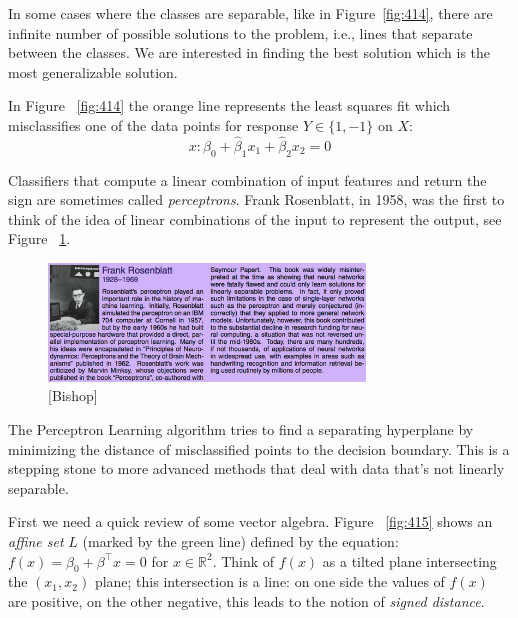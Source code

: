 \documentclass[a4paper]{article}
\begin{document}
In some cases where the classes are separable, like in Figure~\ref{fig:414}, there are infinite number of possible solutions to the problem, i.e., lines that separate between the classes. We are interested in finding the best solution which is the most generalizable solution.

In Figure ~\ref{fig:414} the orange line represents the least squares fit which misclassifies one of the data points for response $Y\in\{1,-1\}$ on $X$:
$${x: \hat\beta_0+\hat\beta_1x_1+\hat\beta_2x_2=0}$$

Classifiers that compute a linear combination of input features and return the sign are sometimes called \textit{perceptrons}. Frank Rosenblatt, in 1958,  was the first to think of the idea of linear combinations of the input to represent the output, see Figure ~\ref{fig:frank}.

\begin{figure}
\centering
\includegraphics[width=0.75\textwidth]{frankRosenblat.png}
\caption{\label{fig:frank}[Bishop]}
\end{figure}

The Perceptron Learning algorithm tries to find a separating hyperplane by minimizing the distance of misclassified points to the decision boundary. This is a stepping stone to more advanced methods that deal with data that's not linearly separable.

First we need a quick review of some vector algebra. Figure ~\ref{fig:415} shows an \textit{affine set} $L$ (marked by the green line) defined by the equation:
$f(x)=\beta_0+\beta^\top x=0$ for  $x\in\mathbb{R}^2$. Think of $f(x)$ as a tilted plane intersecting the $(x_1,x_2)$ plane; this intersection is a line: on one side the values of $f(x)$ are positive, on the other negative, this leads to the notion of \textit{signed distance}.
\end{document}
